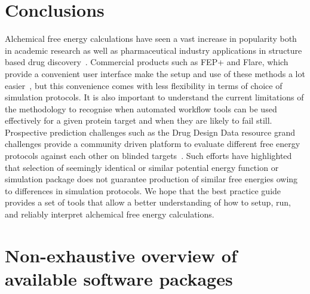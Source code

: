 \documentclass[9pt,bestpractices]{livecoms}
\begin{document}
\section{Conclusions}
\label{sec:conclusion}
Alchemical free energy calculations have seen a vast increase in popularity both in academic research as well as  pharmaceutical industry applications in structure based drug discovery~\cite{schindler2020largescale, sherborne2016collaborating, wagner2017computational}. Commercial products such as FEP+ and Flare, which provide a convenient user interface make the setup and use of these methods a lot easier~\cite{wang2015accurate, kuhn2020automateda}, but this convenience comes with less flexibility in terms of choice of simulation protocols. It is also important to understand the current limitations of the methodology to recognise when automated workflow tools can be used effectively for a given protein target and when they are likely to fail still. Prospective prediction challenges such as the Drug Design Data resource grand challenges provide a community driven platform to evaluate different free energy protocols against each other on blinded targets~\cite{gaieb2018d3r, gaieb2019d3r}. Such efforts have highlighted that selection of seemingly identical or similar potential energy function or simulation package does not guarantee production of similar free energies owing to differences in simulation protocols. 
We hope that the best practice guide provides a set of tools that allow a better understanding of how to setup, run, and reliably interpret alchemical free energy calculations. 


\section{Non-exhaustive overview of available software packages}
\end{document}
